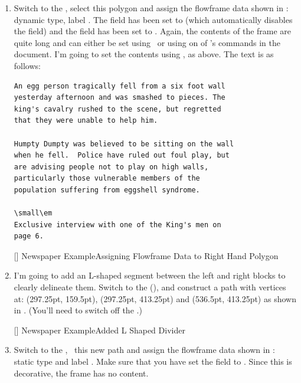 \begin{enumerate}
[]
{}
{Newspaper Example\dash Added Right Hand Polygon}

\item Switch to the , select
this polygon and assign the \gls{flowframe} data shown in
: dynamic type, label .
The  field has been set to
 (which automatically disables the
 field) and the
 field has been set to
. Again, the contents of the
frame are quite long and can either be set using \FlowframTk\ or
using on of 's commands in the document. I'm going to set
the contents using \FlowframTk, as above. The text is as follows:
\begin{verbatim}
An egg person tragically fell from a six foot wall 
yesterday afternoon and was smashed to pieces. The 
king's cavalry rushed to the scene, but regretted 
that they were unable to help him.

Humpty Dumpty was believed to be sitting on the wall 
when he fell.  Police have ruled out foul play, but
are advising people not to play on high walls, 
particularly those vulnerable members of the 
population suffering from eggshell syndrome.

\small\em
Exclusive interview with one of the King's men on 
page 6.
\end{verbatim}

[]
{}
{Newspaper Example\dash Assigning Flowframe Data to Right
Hand Polygon}

\item I'm going to add an L-shaped segment between the left and right
blocks to clearly delineate them. Switch to the
 (), and construct a
\gls{path} with vertices at: (297.25pt, 159.5pt), (297.25pt,
413.25pt) and (536.5pt, 413.25pt) as shown in .
(You'll need to switch off the \gridlock.)

[]
{}
{Newspaper Example\dash Added L Shaped Divider}

\item Switch to the , \select\
this new path and assign the \gls{flowframe} data shown in
: static type and label .  Make sure that you have set the
\widget{flowframe.border} field to
. Since this is decorative, the
frame has no content.


\end{enumerate}
